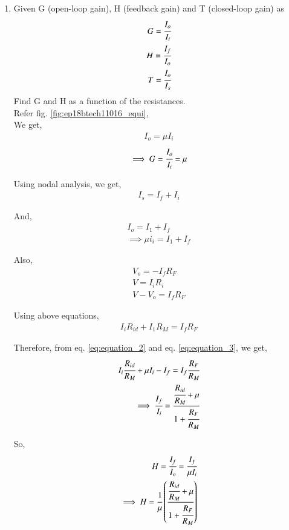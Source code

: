 \begin{enumerate}[label=\arabic*.,ref=\theenumi]
\item Given G (open-loop gain), H (feedback gain) and T (closed-loop gain) as
\begin{align}
    G = \cfrac{I_o}{I_i}\\
    H = \cfrac{I_f}{I_o}\\
    T = \cfrac{I_o}{I_s}
\end{align}
Find G and H as a function of the resistances.
\\
\solution Refer fig. \ref{fig:ep18btech11016_equi},\\
We get,
\begin{align}
    I_o = \mu I_i
\end{align}
\begin{align}
    \implies G = \cfrac{I_o}{I_i} = \mu
    \label{eq:open_loop_gain}
\end{align}

Using nodal analysis, we get,
\begin{align}
    I_s = I_f + I_i
    \label{eq:equation_1}
\end{align}

And,
\begin{align}
    I_o = I_1 + I_f\\
    \implies \mu i_i = I_1 + I_f
    \label{eq:equation_2}
\end{align}

Also,
\begin{align}
    V_o = - I_f R_F\\
    V = I_i R_i\\
    V - V_o = I_f R_F
\end{align}

Using above equations,
\begin{align}
    I_i R_{id} + I_1 R_M = I_f R_F
    \label{eq:equation_3}
\end{align}

Therefore, from eq. \ref{eq:equation_2} and eq. \ref{eq:equation_3}, we get,
\begin{align}
    I_i \cfrac{R_{id}}{R_M} + \mu I_i - I_f = I_f \cfrac{R_F}{R_M}\\
    \implies \cfrac{I_f}{I_i} = \cfrac{\cfrac{R_{id}}{R_M} + \mu}{1 + \cfrac{R_F}{R_M}}
\end{align}

So,
\begin{align}
    H = \cfrac{I_f}{I_o} = \cfrac{I_f}{\mu I_i}\\
    \implies H = \cfrac{1}{\mu}\brak{\cfrac{\cfrac{R_{id}}{R_M} + \mu}{1 + \cfrac{R_F}{R_M}}}
    \label{eq:feedback_gain}
\end{align}


\end{enumerate}
